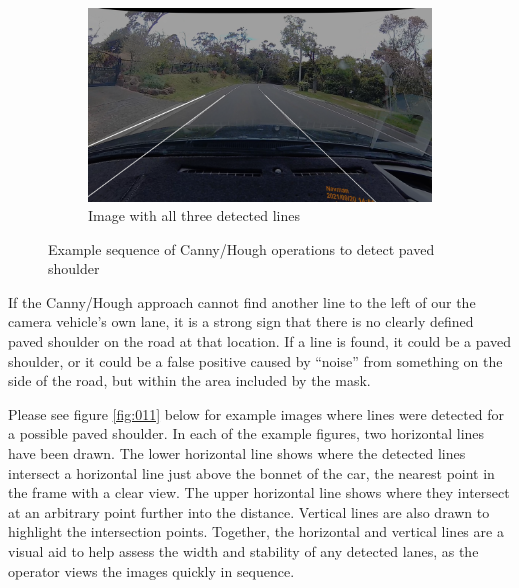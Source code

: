 \documentclass[11pt,twoside]{report}
\begin{document}
\begin{figure}[h]
\hfill
\begin{subfigure}{0.3\textwidth}
	\includegraphics[width=\textwidth]{f010_three_lines.png}
	\caption{Image with all three detected lines}
\end{subfigure}
\caption{Example sequence of Canny/Hough operations to detect paved shoulder}
\label{fig:010}
\end{figure}
If the Canny/Hough approach cannot find another line to the left of our the camera vehicle's own lane, it is a strong sign that there is no clearly defined paved shoulder on the road at that location.  If a line is found, it could be a paved shoulder, or it could be a false positive caused by ``noise'' from something on the side of the road, but within the area included by the mask.

Please see figure \ref{fig:011} below for example images where lines were detected for a possible paved shoulder.  In each of the example figures, two horizontal lines have been drawn.  The lower horizontal line shows where the detected lines intersect a horizontal line just above the bonnet of the car, the nearest point in the frame with a clear view.  The upper horizontal line shows where they intersect at an arbitrary point further into the distance.  Vertical lines are also drawn to highlight the intersection points.  Together, the horizontal and vertical lines are a visual aid to help assess the width and stability of any detected lanes, as the operator views the images quickly in sequence.
\end{document}
